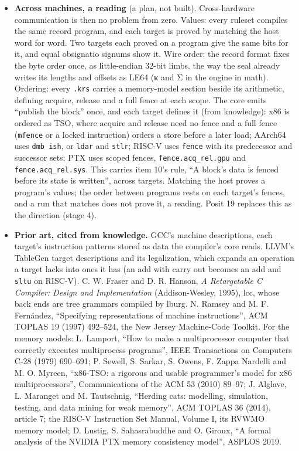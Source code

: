 \begin{enumerate}
\begin{itemize}
\begin{enumerate}
\begin{itemize}
\item \textbf{Across machines, a reading} (a plan, not built). Cross-hardware communication is then no problem from zero. Values: every ruleset compiles the same record program, and each target is proved by matching the host word for word. Two targets each proved on a program give the same bits for it, and equal obsignatio signums show it. Wire order: the record format fixes the byte order once, as little-endian 32-bit limbs, the way the seal already writes its lengths and offsets as LE64 (κ and Σ in the engine in math). Ordering: every \texttt{.\allowbreak{}krs} carries a memory-model section beside its arithmetic, defining acquire, release and a full fence at each scope. The core emits “publish the block” once, and each target defines it (from knowledge): x86 is ordered as TSO, where acquire and release need no fence and a full fence (\texttt{mfence} or a locked instruction) orders a store before a later load; AArch64 uses \texttt{dmb ish}, or \texttt{ldar} and \texttt{stlr}; RISC-V uses \texttt{fence} with its predecessor and successor sets; PTX uses scoped fences, \texttt{fence.\allowbreak{}acq\_\allowbreak{}rel.\allowbreak{}gpu} and \texttt{fence.\allowbreak{}acq\_\allowbreak{}rel.\allowbreak{}sys}. This carries item 10's rule, “A block's data is fenced before its state is written”, across targets. Matching the host proves a program's values; the order between programs rests on each target's fences, and a run that matches does not prove it, a reading. Posit 19 replaces this as the direction (stage 4).
\item \textbf{Prior art, cited from knowledge.} GCC's machine descriptions, each target's instruction patterns stored as data the compiler's core reads. LLVM's TableGen target descriptions and its legalization, which expands an operation a target lacks into ones it has (an add with carry out becomes an add and \texttt{sltu} on RISC-V). C. W. Fraser and D. R. Hanson, \emph{A Retargetable C Compiler: Design and Implementation} (Addison-Wesley, 1995), lcc, whose back ends are tree grammars compiled by lburg. N. Ramsey and M. F. Fernández, “Specifying representations of machine instructions”, ACM TOPLAS 19 (1997) 492–524, the New Jersey Machine-Code Toolkit. For the memory models: L. Lamport, “How to make a multiprocessor computer that correctly executes multiprocess programs”, IEEE Transactions on Computers C-28 (1979) 690–691; P. Sewell, S. Sarkar, S. Owens, F. Zappa Nardelli and M. O. Myreen, “x86-TSO: a rigorous and usable programmer's model for x86 multiprocessors”, Communications of the ACM 53 (2010) 89–97; J. Alglave, L. Maranget and M. Tautschnig, “Herding cats: modelling, simulation, testing, and data mining for weak memory”, ACM TOPLAS 36 (2014), article 7; the RISC-V Instruction Set Manual, Volume I, its RVWMO memory model; D. Lustig, S. Sahasrabuddhe and O. Giroux, “A formal analysis of the NVIDIA PTX memory consistency model”, ASPLOS 2019.

\end{itemize}
\end{enumerate}
\end{itemize}
\end{enumerate}
